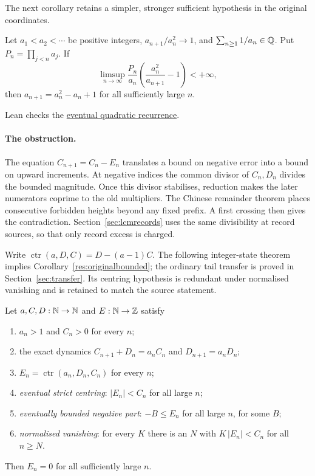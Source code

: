 \documentclass[11pt]{article}
\newcommand{\ctr}{\operatorname{ctr}}
\begin{document}
The next corollary retains a simpler, stronger sufficient hypothesis in the
original coordinates.


\begin{corollary}\label{res:originalbounded}
Let $a_1<a_2<\cdots$ be positive integers, $a_{n+1}/a_n^2\to1$, and
$\sum_{n\ge1}1/a_n\in\mathbb{Q}$.  Put $P_n=\prod_{j<n}a_j$.  If
\[
 \limsup_{n\to\infty}\frac{P_n}{a_n}
 \left(\frac{a_n^2}{a_{n+1}}-1\right)<+\infty,
\]
then $a_{n+1}=a_n^2-a_n+1$ for all sufficiently large $n$.
\end{corollary}

\noindent Lean checks the \href{https://github.com/wcook04/plectis-erdos/blob/f36a98bf3d3e6f65f1074e3b800e3293d5b8a51a/ErdosProblems/Erdos243/PaperCompleteR7/ProductDefect.lean#L211}{eventual quadratic recurrence}.

\paragraph{The obstruction.}
The equation $C_{n+1}=C_n-E_n$ translates a bound on negative error into a
bound on upward increments. At negative indices the common divisor of
$C_n,D_n$ divides the bounded magnitude. Once this divisor stabilises,
reduction makes the later numerators coprime to the old multipliers.
The Chinese remainder theorem places consecutive forbidden heights beyond
any fixed prefix. A first crossing then gives the contradiction.
Section~\ref{sec:lcmrecords} uses the same divisibility at record sources,
so that only record excess is charged.

\begin{samepage}
Write $\ctr(a,D,C)=D-(a-1)C$. The following integer-state theorem
implies Corollary~\ref{res:originalbounded}; the ordinary tail transfer is
proved in Section~\ref{sec:transfer}. Its centring hypothesis is redundant
under normalised vanishing and is retained to match the source statement.

\begin{theorem}\label{res:bounded}
Let $a,C,D:\mathbb{N}\to\mathbb{N}$ and $E:\mathbb{N}\to\mathbb{Z}$ satisfy
\begin{enumerate}
\item $a_n>1$ and $C_n>0$ for every $n$;
\item the exact dynamics $C_{n+1}+D_n=a_nC_n$ and $D_{n+1}=a_nD_n$;
\item $E_n=\ctr(a_n,D_n,C_n)$ for every $n$;
\item \emph{eventual strict centring}: $|E_n|<C_n$ for all large $n$;
\item \emph{eventually bounded negative part}: $-B\le E_n$ for all large $n$,
for some $B$;
\item \emph{normalised vanishing}: for every $K$ there is an $N$ with
$K\,|E_n|<C_n$ for all $n\ge N$.
\end{enumerate}
Then $E_n=0$ for all sufficiently large $n$.
\end{theorem}
\end{samepage}
\end{document}
